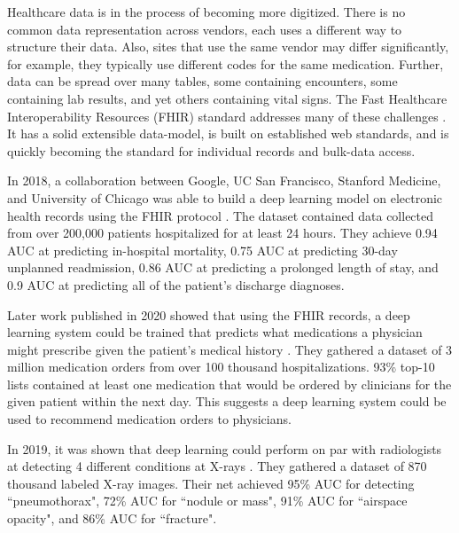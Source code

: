 Healthcare data is in the process of becoming more digitized.  There is no common data representation across vendors, each uses a different way to structure their data.  Also, sites that use the same vendor may differ significantly, for example, they typically use different codes for the same medication. Further, data can be spread over many tables, some containing encounters, some containing lab results, and yet others containing vital signs. The Fast Healthcare Interoperability Resources (FHIR) standard addresses many of these challenges \cite{mandel2016smart}. It has a solid extensible data-model, is built on established web standards, and is quickly becoming the standard for individual records and bulk-data access.  

In 2018, a collaboration between Google, UC San Francisco, Stanford Medicine, and University of Chicago was able to build a deep learning model on electronic health records using the FHIR protocol \cite{rajkomar2018scalable}.  The dataset contained data collected from over 200,000 patients hospitalized for at least 24 hours.  They achieve 0.94 AUC at predicting in-hospital mortality, 0.75 AUC at predicting 30-day unplanned readmission, 0.86 AUC at predicting a prolonged length of stay, and 0.9 AUC at predicting all of the patient's discharge diagnoses.

Later work published in 2020 showed that using the FHIR records, a deep learning system could be trained that predicts what medications a physician might prescribe given the patient's medical history \cite{rough2020predicting}.  They gathered a dataset of 3 million medication orders from over 100 thousand hospitalizations.  93\% top-10 lists contained at least one medication that would be ordered by clinicians for the given patient within the next day.  This suggests a deep learning system could be used to recommend medication orders to physicians.

In 2019, it was shown that deep learning could perform on par with radiologists at detecting 4 different conditions at X-rays \cite{majkowska2020chest}.  They gathered a dataset of 870 thousand labeled X-ray images.  Their net achieved 95\% AUC for detecting ``pneumothorax", 72\% AUC for ``nodule or mass", 91\% AUC for ``airspace opacity", and 86\% AUC for ``fracture".


